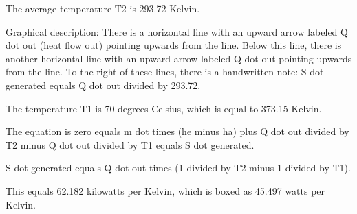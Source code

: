 The average temperature T2 is 293.72 Kelvin.

Graphical description: There is a horizontal line with an upward arrow labeled Q dot out (heat flow out) pointing upwards from the line. Below this line, there is another horizontal line with an upward arrow labeled Q dot out pointing upwards from the line. To the right of these lines, there is a handwritten note: S dot generated equals Q dot out divided by 293.72.

The temperature T1 is 70 degrees Celsius, which is equal to 373.15 Kelvin.

The equation is zero equals m dot times (he minus ha) plus Q dot out divided by T2 minus Q dot out divided by T1 equals S dot generated.

S dot generated equals Q dot out times (1 divided by T2 minus 1 divided by T1).

This equals 62.182 kilowatts per Kelvin, which is boxed as 45.497 watts per Kelvin.